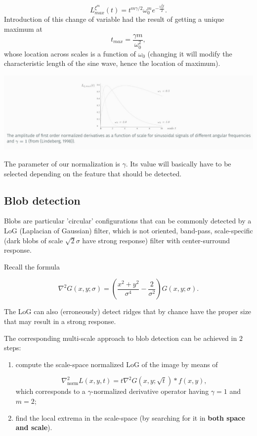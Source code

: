 \documentclass[10pt]{report}
\begin{document}
\[ L^{\xi^m}_ {max} (t) = t^{m\gamma/2}\omega_0^m e^{-\frac{\omega^2_0 t}{2}}.\]
Introduction of this change of variable had the result of getting a
unique maximum at \[t_{max} = \frac{\gamma m}{\omega_0^2},\] whose
location across scales is a function of \(\omega_0\) (changing it will
modify the characteristic length of the sine wave, hence the location of
maximum).

\begin{center}
\includegraphics[width=.9\linewidth]{./pics/det/amplitude-normalization.jpg}
\end{center}

The parameter of our normalization is \(\gamma\). Its value will
basically have to be selected depending on the feature that should be
detected.

\subsection{Blob detection}
\label{blob-detection}
Blobs are particular 'circular' configurations that can be commonly
detected by a LoG (Laplacian of Gaussian) filter, which is not oriented,
band-pass, scale-specific (dark blobs of scale \(\sqrt{2}\sigma\) have
strong response) filter with center-surround response.

Recall the formula

\[\nabla^2 G(x, y; \sigma) = \left(\frac{x^2 + y^2}{\sigma^4} - \frac{2}{\sigma^2}\right) G(x, y; \sigma).\]

The LoG can also (erroneously) detect ridges that by chance have the
proper size that may result in a strong response.

The corresponding multi-scale approach to blob detection can be achieved
in \(2\) steps:

\begin{enumerate}
\item compute the scale-space normalized LoG of the image by means of

\[ \nabla^2_{\mbox{norm}} L(x, y, t) = t\nabla^2 G(x, y; \sqrt{t}) * f(x, y),\]
which corresponds to a \(\gamma\)-normalized derivative operator
having \(\gamma=1\) and \(m=2\);

\item find the local extrema in the scale-space (by searching for it in
\textbf{both space and scale}).
\end{enumerate}
\end{document}
